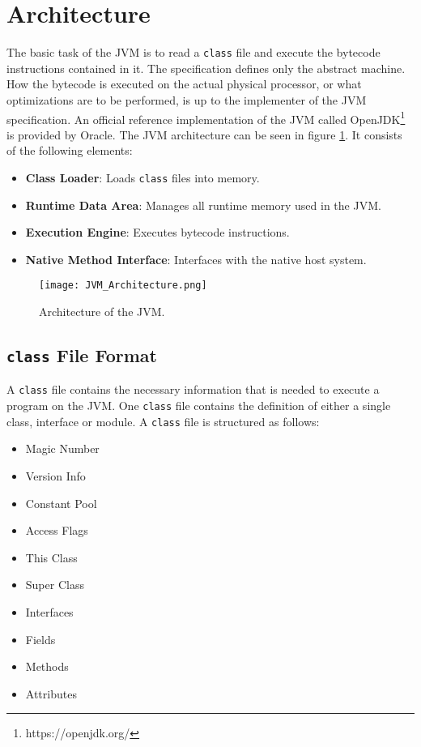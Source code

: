 \section{Architecture}

The basic task of the JVM is to read a \texttt{class} file and execute the bytecode instructions contained in it. The specification defines only the abstract machine. How the bytecode is executed on the actual physical processor, or what optimizations are to be performed, is up to the implementer of the JVM specification. An official reference implementation of the JVM called OpenJDK\footnote{https://openjdk.org/} is provided by Oracle. 
The JVM architecture can be seen in figure \ref{fig:JVMArchitecture}. It consists of the following elements: 

\begin{itemize}
    \item \textbf{Class Loader}: Loads \texttt{class} files into memory.
    \item \textbf{Runtime Data Area}: Manages all runtime memory used in the JVM.
    \item \textbf{Execution Engine}: Executes bytecode instructions.
    \item \textbf{Native Method Interface}: Interfaces with the native host system. 
\end{itemize}

\begin{figure}[]
    \centering
    \texttt{[image: JVM\_Architecture.png]}
    \caption{Architecture of the JVM.}
    \label{fig:JVMArchitecture}
\end{figure}

\subsection{\texttt{class} File Format}

A \texttt{class} file contains the necessary information that is needed to execute a program on the JVM. One \texttt{class} file contains the definition of either a single class, interface or module. A \texttt{class} file is structured as follows: 

\begin{itemize}
    \item Magic Number
    \item Version Info
    \item Constant Pool
    \item Access Flags
    \item This Class
    \item Super Class
    \item Interfaces
    \item Fields
    \item Methods
    \item Attributes
\end{itemize}

